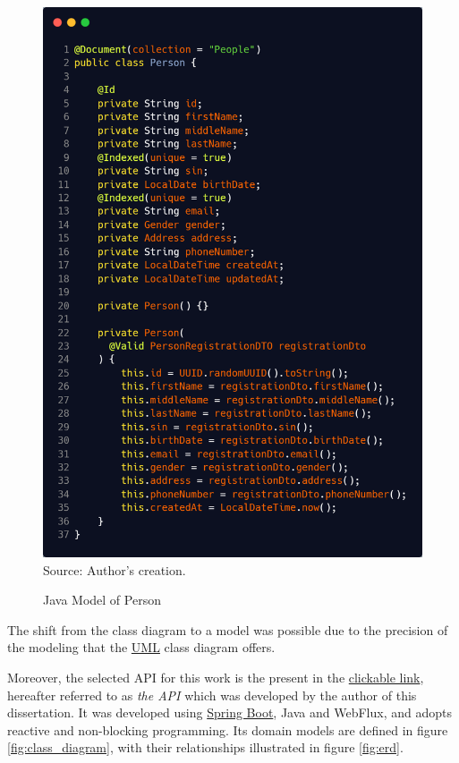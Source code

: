 \begin{figure}[H]
	\centering
	\caption{Java Model of Person}
	\includegraphics[width=1\linewidth]{figures/api/java_person_model.png}
	\label{fig:java_person_model}
	\footnotesize Source: Author's creation.
\end{figure}

The shift from the class diagram to a model was possible due to the precision of the modeling that the \hyperref[appendix:glossary]{UML} class diagram offers.

Moreover, the selected API for this work is the present in the \href{https://github.com/LazaroDamasceno/Reactive-Medical-Appointments-Management-API.git}{clickable link}, hereafter referred to as \textit{the API} which was developed by the author of this dissertation. It was developed using  \hyperref[appendix:glossary]{Spring Boot}, Java and WebFlux, and adopts reactive and non-blocking programming. Its domain models are defined in figure \ref{fig:class_diagram}, with their relationships illustrated in figure \ref{fig:erd}.

